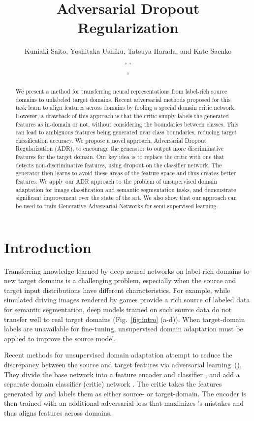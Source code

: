 \documentclass{article} \usepackage{iclr2018_conference,times}
\title{Adversarial Dropout Regularization}
\author{Kuniaki Saito\affmark[1], Yoshitaka Ushiku\affmark[1], Tatsuya Harada\affmark[1,2], and Kate Saenko\affmark[3]\\
  \affaddr{\affmark[1]The University of Tokyo}, \affaddr{\affmark[2]RIKEN}, \affaddr{\affmark[3]Boston University}\\
  \email{\{k-saito,ushiku,harada\}@mi.t.u-tokyo.ac.jp},   \email{saenko@bu.edu}\\
  }
\begin{document}
\maketitle

\begin{abstract}
We present a method for transferring neural representations from label-rich source domains to unlabeled target domains. Recent adversarial methods proposed for this task learn to align features across domains by fooling a special domain critic network. However, a drawback of this approach is that the critic simply labels the generated features as in-domain or not, without considering the boundaries between classes. This can lead to ambiguous features being generated near class boundaries, reducing target classification accuracy. We propose a novel approach, Adversarial Dropout Regularization (ADR), to encourage the generator to output more discriminative features for the target domain. Our key idea is to replace the critic with one that detects non-discriminative features, using dropout on the classifier network. The generator then learns to avoid these areas of the feature space and thus creates better features. We apply our ADR approach to the problem of unsupervised domain adaptation for image classification and semantic segmentation tasks, and demonstrate significant improvement over the state of the art. We also show that our approach can be used to train Generative Adversarial Networks for semi-supervised learning. 
\end{abstract}

\section{Introduction}
\vspace{-3mm}        


Transferring knowledge learned by deep neural networks on label-rich domains to new target domains is a challenging problem, especially when the source and target input distributions have different characteristics. For example, while simulated driving images rendered by games provide a rich source of labeled data for semantic segmentation, deep models trained on such source data do not transfer well to real target domains (Fig.~\ref{fig:intro} (a-d)). When target-domain labels are unavailable for fine-tuning, unsupervised domain adaptation must be applied to improve the source model. 

Recent methods for unsupervised domain adaptation attempt to reduce the discrepancy between the source and target features via adversarial learning~(\cite{tzeng2014deep,ganin2014unsupervised}). They divide the base network into a feature encoder  and classifier , and add a separate domain classifier (critic) network . The critic takes the features generated by  and labels them as either source- or target-domain. The encoder  is then trained with an additional adversarial loss that maximizes 's mistakes and thus aligns features across domains.
\end{document}
